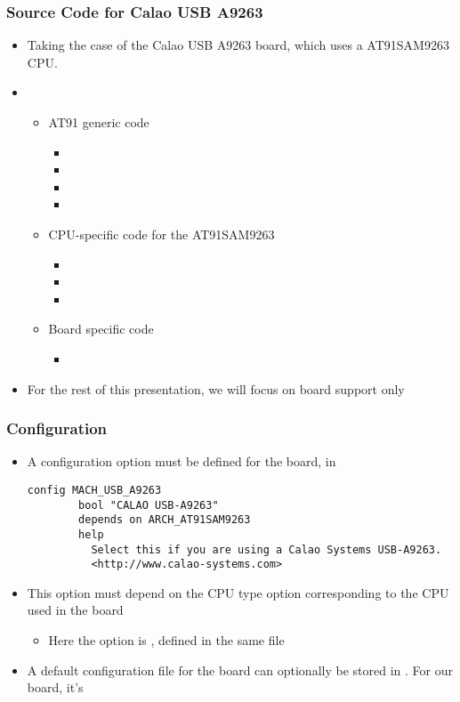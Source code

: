 \begin{frame}
  \frametitle{Source Code for Calao USB A9263}
  \begin{itemize}
  \item Taking the case of the Calao USB A9263 board, which uses a
    AT91SAM9263 CPU.
  \item {}
    \begin{itemize}
    \item AT91 generic code
      \begin{itemize}
      \item {}
      \item {}
      \item {}
      \item {}
      \end{itemize}
    \item CPU-specific code for the AT91SAM9263
      \begin{itemize}
      \item {}
      \item {}
      \item {}
      \end{itemize}
    \item Board specific code
      \begin{itemize}
      \item {}
      \end{itemize}
    \end{itemize}
  \item For the rest of this presentation, we will focus on board
    support only
  \end{itemize}
\end{frame}

\begin{frame}[fragile]
  \frametitle{Configuration}
  \begin{itemize}
  \item A configuration option must be defined for the board, in
{\scriptsize
\begin{verbatim}
config MACH_USB_A9263
        bool "CALAO USB-A9263"
        depends on ARCH_AT91SAM9263
        help
          Select this if you are using a Calao Systems USB-A9263.
          <http://www.calao-systems.com>
\end{verbatim}
}
  \item This option must depend on the CPU type option corresponding
    to the CPU used in the board
    \begin{itemize}
    \item Here the option is , defined in the
      same file
    \end{itemize}
  \item A default configuration file for the board can optionally be
    stored in . For our board, it's
  \end{itemize}
\end{frame}

